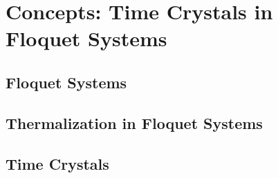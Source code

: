 \chapter{Concepts: Time Crystals in Floquet Systems}\label{ch:introduction-floquet}

\section{Floquet Systems}

\section{Thermalization in Floquet Systems}

\section{Time Crystals}

